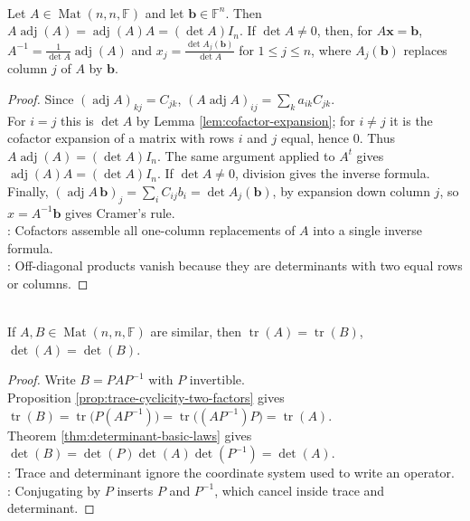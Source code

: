 \begin{theorem} \label{thm:adjugate-identity-and-cramers-rule} \\
Let $A\in\operatorname{Mat}(n,n,\mathbb{F})$ and let $\mathbf{b}\in\mathbb{F}^n$. Then $A\operatorname{adj}(A)=\operatorname{adj}(A)A=(\det A)I_n$. If $\det A\neq0$, then, for $A\mathbf{x}=\mathbf{b}$, $A^{-1}=\frac{1}{\det A}\operatorname{adj}(A)$ and $x_j=\frac{\det A_j(\mathbf{b})}{\det A}$ for $1\leq j\leq n$, where $A_j(\mathbf{b})$ replaces column $j$ of $A$ by $\mathbf{b}$.
\begin{proof}
Since $(\operatorname{adj}A)_{kj}=C_{jk}$, $(A\operatorname{adj}A)_{ij}=\sum\limits_k a_{ik}C_{jk}$.\\
For $i=j$ this is $\det A$ by Lemma \ref{lem:cofactor-expansion}; for $i\neq j$ it is the cofactor expansion of a matrix with rows $i$ and $j$ equal, hence $0$. Thus $A\operatorname{adj}(A)=(\det A)I_n$. The same argument applied to $A^t$ gives $\operatorname{adj}(A)A=(\det A)I_n$. If $\det A\neq0$, division gives the inverse formula. Finally, $(\operatorname{adj}A\,\mathbf{b})_j=\sum_i C_{ij}b_i=\det A_j(\mathbf{b})$, by expansion down column $j$, so $x=A^{-1}\mathbf{b}$ gives Cramer's rule.\\
: Cofactors assemble all one-column replacements of $A$ into a single inverse formula.\\
: Off-diagonal products vanish because they are determinants with two equal rows or columns.
\end{proof}
\end{theorem}

\begin{theorem} \label{thm:similarity-preserves-trace-and-determinant} \\
If $A,B\in\operatorname{Mat}(n,n,\mathbb{F})$ are similar, then $\operatorname{tr}(A)=\operatorname{tr}(B)$, $\det(A)=\det(B)$.
\begin{proof}
Write $B=PAP^{-1}$ with $P$ invertible.\\
Proposition \ref{prop:trace-cyclicity-two-factors} gives $\operatorname{tr}(B)=\operatorname{tr}\bigl(P(AP^{-1})\bigr) =\operatorname{tr}\bigl((AP^{-1})P\bigr) =\operatorname{tr}(A)$.\\
Theorem \ref{thm:determinant-basic-laws} gives $\det(B)=\det(P)\det(A)\det(P^{-1})=\det(A)$.\\
: Trace and determinant ignore the coordinate system used to write an operator.\\
: Conjugating by $P$ inserts $P$ and $P^{-1}$, which cancel inside trace and determinant.
\end{proof}
\end{theorem}

